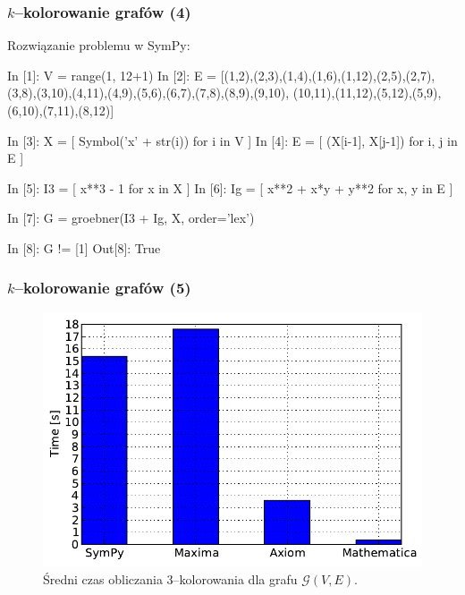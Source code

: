 \documentclass[10pt]{beamer}
\begin{document}
\begin{frame}[fragile]
    \frametitle{$k$--kolorowanie grafów (4)}

    Rozwiązanie problemu  w SymPy:
    \begin{python}
In [1]: V = range(1, 12+1)
In [2]: E = [(1,2),(2,3),(1,4),(1,6),(1,12),(2,5),(2,7),
(3,8),(3,10),(4,11),(4,9),(5,6),(6,7),(7,8),(8,9),(9,10),
(10,11),(11,12),(5,12),(5,9),(6,10),(7,11),(8,12)]

In [3]: X = [ Symbol('x' + str(i)) for i in V ]
In [4]: E = [ (X[i-1], X[j-1]) for i, j in E ]

In [5]: I3 = [ x**3 - 1 for x in X ]
In [6]: Ig = [ x**2 + x*y + y**2 for x, y in E ]

In [7]: G = groebner(I3 + Ig, X, order='lex')

In [8]: G != [1]
Out[8]: True
    \end{python}
\end{frame}

\begin{frame}[fragile]
    \frametitle{$k$--kolorowanie grafów (5)}

    \begin{figure}
        \begin{center}
            \includegraphics[scale=0.55]{images/groebner-time-compare.pdf}
        \end{center}
        \caption{Średni czas obliczania $3$--kolorowania dla grafu $\mathcal{G}(V, E)$.}
    \end{figure}
\end{frame}
\end{document}
